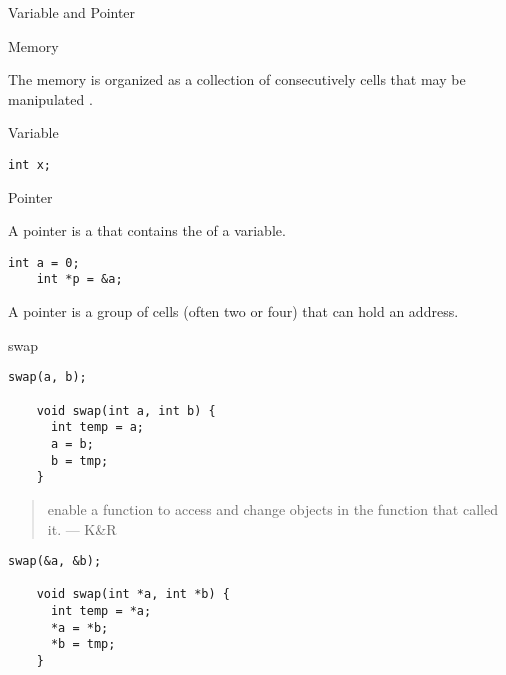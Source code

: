 \begin{frame}{}
  \centerline{\Large Variable and Pointer}
\end{frame}

\begin{frame}{Memory}
  \begin{definition}[Memory (K\&R)]
    The memory is organized as a collection of consecutively  cells
    that may be manipulated .
  \end{definition}

\end{frame}

\begin{frame}[fragile]{Variable}
  \begin{lstlisting}[style = CStyle]
                  int x;
  \end{lstlisting}
\end{frame}

\begin{frame}[fragile]{Pointer}
  \begin{definition}[Pointer (K\&R)]
    A pointer is a  that contains the  of a variable.
  \end{definition}

  \vspace{0.50cm}
  \begin{lstlisting}[style = Cstyle]
    int a = 0;
    int *p = &a;
  \end{lstlisting}

  \vspace{0.50cm}
  \pause
  \begin{definition}
    A pointer is a group of cells (often two or four) that can hold an address.
  \end{definition}
\end{frame}

\begin{frame}[fragile]{\textsf{swap}}
  \begin{lstlisting}[style = Cstyle]
    swap(a, b);

    void swap(int a, int b) {
      int temp = a;
      a = b;
      b = tmp;
    }
  \end{lstlisting}

  \pause
  \begin{quote}
     enable a function to access and change objects
    in the function that called it.  \hfill --- K\&R
  \end{quote}

  \pause
  \begin{lstlisting}[style = Cstyle]
    swap(&a, &b);

    void swap(int *a, int *b) {
      int temp = *a;
      *a = *b;
      *b = tmp;
    }
  \end{lstlisting}
\end{frame}
